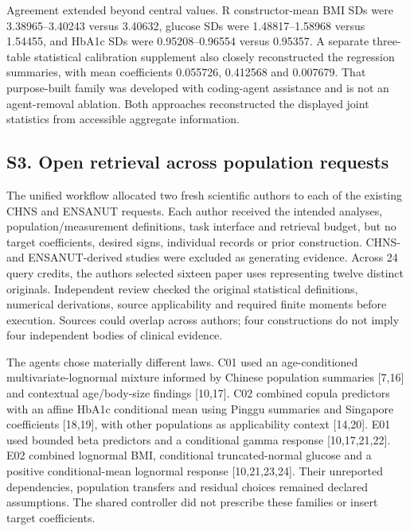 \documentclass[11pt,letterpaper]{article}
\begin{document}
\endgroup

Agreement extended beyond central values. R constructor-mean BMI SDs were 3.38965–\allowbreak{}3.40243 versus 3.40632, glucose SDs were 1.48817–\allowbreak{}1.58968 versus 1.54455, and HbA1c SDs were 0.95208–\allowbreak{}0.96554 versus 0.95357. A separate three-table statistical calibration supplement also closely reconstructed the regression summaries, with mean coefficients 0.055726, 0.412568 and 0.007679. That purpose-built family was developed with coding-agent assistance and is not an agent-removal ablation. Both approaches reconstructed the displayed joint statistics from accessible aggregate information.


\subsection*{S3. Open retrieval across population requests}

The unified workflow allocated two fresh scientific authors to each of the existing CHNS and ENSANUT requests. Each author received the intended analyses, population/\allowbreak{}measurement definitions, task interface and retrieval budget, but no target coefficients, desired signs, individual records or prior construction. CHNS- and ENSANUT-derived studies were excluded as generating evidence. Across 24 query credits, the authors selected sixteen paper uses representing twelve distinct originals. Independent review checked the original statistical definitions, numerical derivations, source applicability and required finite moments before execution. Sources could overlap across authors; four constructions do not imply four independent bodies of clinical evidence.


The agents chose materially different laws. C01 used an age-conditioned multivariate-lognormal mixture informed by Chinese population summaries [7,16] and contextual age/\allowbreak{}body-size findings [10,17]. C02 combined copula predictors with an affine HbA1c conditional mean using Pinggu summaries and Singapore coefficients [18,19], with other populations as applicability context [14,20]. E01 used bounded beta predictors and a conditional gamma response [10,17,21,22]. E02 combined lognormal BMI, conditional truncated-normal glucose and a positive conditional-mean lognormal response [10,21,23,24]. Their unreported dependencies, population transfers and residual choices remained declared assumptions. The shared controller did not prescribe these families or insert target coefficients.
\end{document}
